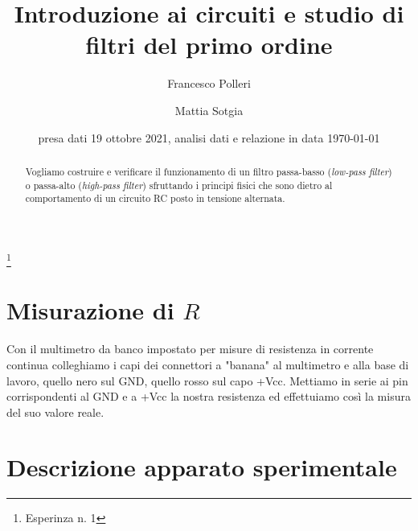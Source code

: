 \documentclass[
    rmp,
    reprint, 
    superscriptaddress, 
    altaffilletter, 
    amsmath, 
    amssymb, 
    a4paper]{revtex4-2}
\begin{document}
\title{
    Introduzione ai circuiti e studio di filtri del primo ordine
}
\thanks{
    Esperinza n. 1
}

\author{Francesco Polleri}
\author{Mattia Sotgia}


\date{presa dati
    19 ottobre 2021, analisi dati e relazione in data 
    \today
}

\begin{abstract}
    Vogliamo costruire e verificare il funzionamento di un filtro passa-basso (\textit{low-pass filter}) o passa-alto (\textit{high-pass filter}) sfruttando i principi fisici che sono dietro al comportamento di un circuito RC posto in tensione alternata.
        
\end{abstract}
\maketitle
\thispagestyle{fancy}
\section{Misurazione di $R$}
Con il multimetro da banco impostato per misure di resistenza in corrente continua colleghiamo i capi dei connettori a "banana" al multimetro e alla base di lavoro, quello nero sul GND, quello rosso sul capo +Vcc. 
Mettiamo in serie ai pin corrispondenti al GND e a +Vcc la nostra resistenza ed effettuiamo così la misura del suo valore reale. 

\section{Descrizione apparato sperimentale}
\label{section:introduction}
\end{document}
